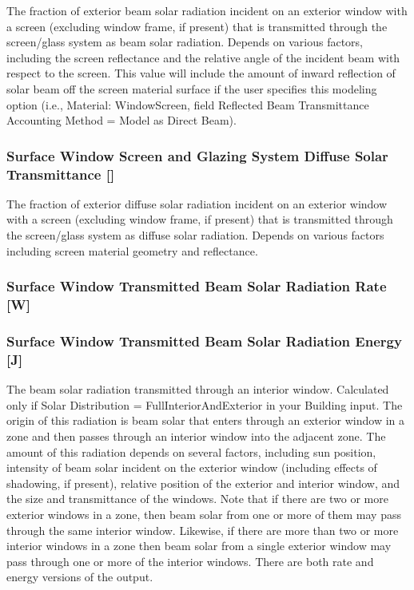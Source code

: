 The fraction of exterior beam solar radiation incident on an exterior window with a screen (excluding window frame, if present) that is transmitted through the screen/glass system as beam solar radiation. Depends on various factors, including the screen reflectance and the relative angle of the incident beam with respect to the screen. This value will include the amount of inward reflection of solar beam off the screen material surface if the user specifies this modeling option (i.e., Material: WindowScreen, field Reflected Beam Transmittance Accounting Method = Model as Direct Beam).

\subsubsection{Surface Window Screen and Glazing System Diffuse Solar Transmittance {[]}}\label{surface-window-screen-and-glazing-system-diffuse-solar-transmittance}

The fraction of exterior diffuse solar radiation incident on an exterior window with a screen (excluding window frame, if present) that is transmitted through the screen/glass system as diffuse solar radiation. Depends on various factors including screen material geometry and reflectance.

\subsubsection{Surface Window Transmitted Beam Solar Radiation Rate {[}W{]}}\label{surface-window-transmitted-beam-solar-radiation-rate-w-1}

\subsubsection{Surface Window Transmitted Beam Solar Radiation Energy {[}J{]}}\label{surface-window-transmitted-beam-solar-radiation-energy-j-1}

The beam solar radiation transmitted through an interior window. Calculated only if Solar Distribution = FullInteriorAndExterior in your Building input. The origin of this radiation is beam solar that enters through an exterior window in a zone and then passes through an interior window into the adjacent zone. The amount of this radiation depends on several factors, including sun position, intensity of beam solar incident on the exterior window (including effects of shadowing, if present), relative position of the exterior and interior window, and the size and transmittance of the windows. Note that if there are two or more exterior windows in a zone, then beam solar from one or more of them may pass through the same interior window. Likewise, if there are more than two or more interior windows in a zone then beam solar from a single exterior window may pass through one or more of the interior windows. There are both rate and energy versions of the output.

